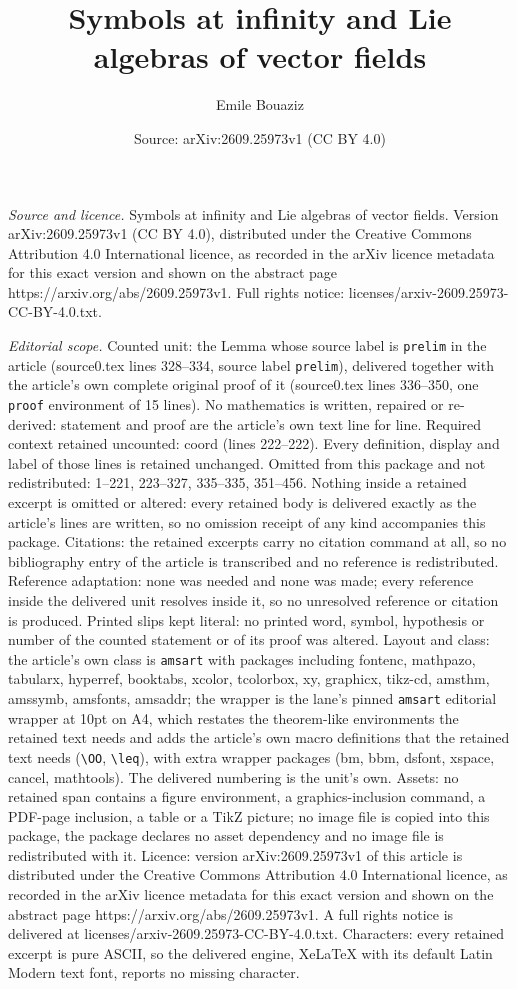 \documentclass[10pt,a4paper]{amsart}
\title[Symbols at infinity and Lie algebras of vector fields]{Symbols at infinity and Lie algebras of vector fields}
\author{Emile Bouaziz}
\date{Source: arXiv:2609.25973v1 (CC BY 4.0)}
\begin{document}
\maketitle

\noindent\emph{Source and licence.} Symbols at infinity and Lie algebras of vector fields. Version arXiv:2609.25973v1 (CC BY 4.0), distributed under the Creative Commons Attribution 4.0 International licence, as recorded in the arXiv licence metadata for this exact version and shown on the abstract page https://arxiv.org/abs/2609.25973v1. Full rights notice: licenses/arxiv-2609.25973-CC-BY-4.0.txt.\par\smallskip

\noindent\textit{Editorial scope.} Counted unit: the Lemma whose source label is \texttt{prelim} in the article (source0.tex lines 328--334, source label \texttt{prelim}), delivered together with the article's own complete original proof of it (source0.tex lines 336--350, one \texttt{proof} environment of 15 lines). No mathematics is written, repaired or re-derived: statement and proof are the article's own text line for line. Required context retained uncounted: coord (lines 222--222). Every definition, display and label of those lines is retained unchanged. Omitted from this package and not redistributed: 1--221, 223--327, 335--335, 351--456. Nothing inside a retained excerpt is omitted or altered: every retained body is delivered exactly as the article's lines are written, so no omission receipt of any kind accompanies this package. Citations: the retained excerpts carry no citation command at all, so no bibliography entry of the article is transcribed and no reference is redistributed. Reference adaptation: none was needed and none was made; every reference inside the delivered unit resolves inside it, so no unresolved reference or citation is produced. Printed slips kept literal: no printed word, symbol, hypothesis or number of the counted statement or of its proof was altered. Layout and class: the article's own class is \texttt{amsart} with packages including fontenc, mathpazo, tabularx, hyperref, booktabs, xcolor, tcolorbox, xy, graphicx, tikz-cd, amsthm, amssymb, amsfonts, amsaddr; the wrapper is the lane's pinned \texttt{amsart} editorial wrapper at 10pt on A4, which restates the theorem-like environments the retained text needs and adds the article's own macro definitions that the retained text needs (\texttt{\textbackslash OO}, \texttt{\textbackslash leq}), with extra wrapper packages (bm, bbm, dsfont, xspace, cancel, mathtools). The delivered numbering is the unit's own. Assets: no retained span contains a figure environment, a graphics-inclusion command, a PDF-page inclusion, a table or a TikZ picture; no image file is copied into this package, the package declares no asset dependency and no image file is redistributed with it. Licence: version arXiv:2609.25973v1 of this article is distributed under the Creative Commons Attribution 4.0 International licence, as recorded in the arXiv licence metadata for this exact version and shown on the abstract page https://arxiv.org/abs/2609.25973v1. A full rights notice is delivered at licenses/arxiv-2609.25973-CC-BY-4.0.txt. Characters: every retained excerpt is pure ASCII, so the delivered engine, XeLaTeX with its default Latin Modern text font, reports no missing character.
\end{document}
